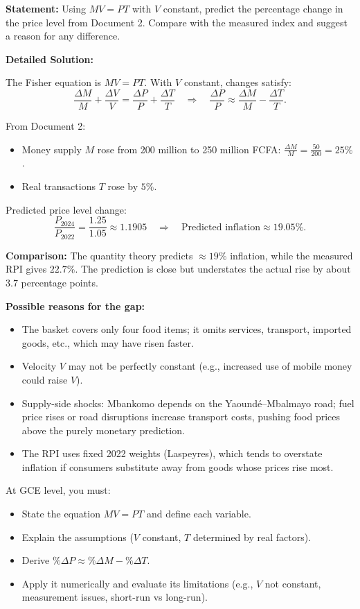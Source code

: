 \documentclass[11pt]{article}
\begin{document}
\begin{exoresolu}
\textbf{Statement:} Using $MV = PT$ with $V$ constant, predict the percentage change in the price level from Document 2. Compare with the measured index and suggest a reason for any difference.

\tcblower
\textbf{Detailed Solution:}

The Fisher equation is $MV = PT$. With $V$ constant, changes satisfy:
\[
\frac{\Delta M}{M} + \frac{\Delta V}{V} = \frac{\Delta P}{P} + \frac{\Delta T}{T} \quad \Rightarrow \quad \frac{\Delta P}{P} \approx \frac{\Delta M}{M} - \frac{\Delta T}{T}.
\]

From Document 2:
\begin{itemize}
\item Money supply $M$ rose from 200 million to 250 million FCFA: $\frac{\Delta M}{M} = \frac{50}{200} = 25\%$.
\item Real transactions $T$ rose by $5\%$.
\end{itemize}

Predicted price level change:
\[
\frac{P_{2024}}{P_{2022}} = \frac{1.25}{1.05} \approx 1.1905 \quad \Rightarrow \quad \text{Predicted inflation} \approx \mathbf{19.05\%}.
\]

\textbf{Comparison:} The quantity theory predicts $\approx 19\%$ inflation, while the measured RPI gives $22.7\%$. The prediction is close but understates the actual rise by about $3.7$ percentage points.

\textbf{Possible reasons for the gap:}
\begin{itemize}
\item The basket covers only four food items; it omits services, transport, imported goods, etc., which may have risen faster.
\item Velocity $V$ may not be perfectly constant (e.g., increased use of mobile money could raise $V$).
\item Supply-side shocks: Mbankomo depends on the Yaound\'e--Mbalmayo road; fuel price rises or road disruptions increase transport costs, pushing food prices above the purely monetary prediction.
\item The RPI uses fixed 2022 weights (Laspeyres), which tends to overstate inflation if consumers substitute away from goods whose prices rise most.
\end{itemize}

\begin{aretenir}
At GCE level, you must:
\begin{itemize}
\item State the equation $MV = PT$ and define each variable.
\item Explain the assumptions ($V$ constant, $T$ determined by real factors).
\item Derive $\% \Delta P \approx \% \Delta M - \% \Delta T$.
\item Apply it numerically and evaluate its limitations (e.g., $V$ not constant, measurement issues, short-run vs long-run).
\end{itemize}
\end{aretenir}
\end{exoresolu}
\end{document}
